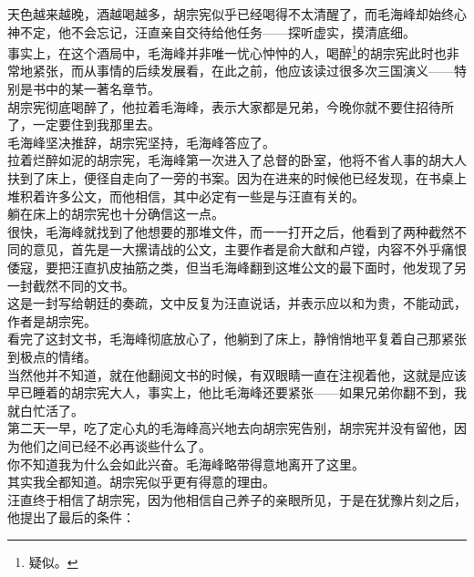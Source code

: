 \begin{multicols}{\theparacolNo}
天色越来越晚，酒越喝越多，胡宗宪似乎已经喝得不太清醒了，而毛海峰却始终心神不定，他不会忘记，汪直亲自交待给他任务——探听虚实，摸清底细。\\

事实上，在这个酒局中，毛海峰并非唯一忧心忡忡的人，喝醉\footnote{疑似。}的胡宗宪此时也非常地紧张，而从事情的后续发展看，在此之前，他应该读过很多次三国演义——特别是书中的某一著名章节。\\

胡宗宪彻底喝醉了，他拉着毛海峰，表示大家都是兄弟，今晚你就不要住招待所了，一定要住到我那里去。\\

毛海峰坚决推辞，胡宗宪坚持，毛海峰答应了。\\

拉着烂醉如泥的胡宗宪，毛海峰第一次进入了总督的卧室，他将不省人事的胡大人扶到了床上，便径自走向了一旁的书案。因为在进来的时候他已经发现，在书桌上堆积着许多公文，而他相信，其中必定有一些是与汪直有关的。\\

躺在床上的胡宗宪也十分确信这一点。\\

很快，毛海峰就找到了他想要的那堆文件，而一一打开之后，他看到了两种截然不同的意见，首先是一大摞请战的公文，主要作者是俞大猷和卢镗，内容不外乎痛恨倭寇，要把汪直扒皮抽筋之类，但当毛海峰翻到这堆公文的最下面时，他发现了另一封截然不同的文书。\\

这是一封写给朝廷的奏疏，文中反复为汪直说话，并表示应以和为贵，不能动武，作者是胡宗宪。\\

看完了这封文书，毛海峰彻底放心了，他躺到了床上，静悄悄地平复着自己那紧张到极点的情绪。\\

当然他并不知道，就在他翻阅文书的时候，有双眼睛一直在注视着他，这就是应该早已睡着的胡宗宪大人，事实上，他比毛海峰还要紧张——如果兄弟你翻不到，我就白忙活了。\\

第二天一早，吃了定心丸的毛海峰高兴地去向胡宗宪告别，胡宗宪并没有留他，因为他们之间已经不必再谈些什么了。\\

你不知道我为什么会如此兴奋。毛海峰略带得意地离开了这里。\\

其实我全都知道。胡宗宪似乎更有得意的理由。\\

汪直终于相信了胡宗宪，因为他相信自己养子的亲眼所见，于是在犹豫片刻之后，他提出了最后的条件：\\


\end{multicols}
